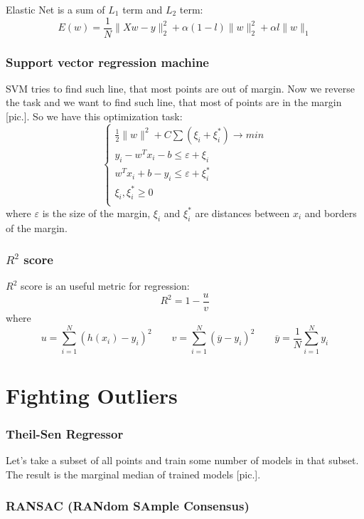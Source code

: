 Elastic Net is a sum of $L_1$ term and $L_2$ term:
$$E(w)=\frac{1}{N}\|Xw-y\|_2^2+\alpha(1-l)\|w\|_2^2+\alpha l\|w\|_1$$

\subsubsection*{Support vector regression machine}

SVM tries to find such line, that most points are out of margin. Now we reverse the task and we want to find such line, that most of points are in the margin [pic.]. So we have this optimization task:
$$\begin{cases}
	\frac{1}{2}\|w\|^2+C\sum(\xi_i+\xi_i^*)\to min \\
	y_i-w^Tx_i-b\le\varepsilon+\xi_i \\
	w^Tx_i+b-y_i\le\varepsilon+\xi_i^* \\
	\xi_i,\xi_i^* \ge 0 \\
\end{cases}$$
where $\varepsilon$ is the size of the margin, $\xi_i$ and $\xi_i^*$ are distances between $x_i$ and borders of the margin.

\subsubsection*{$R^2$ score}

$R^2$ score is an useful metric for regression:
$$R^2=1-\frac{u}{v}$$
where
$$u=\sum\limits_{i=1}^{N}(h(x_i)-y_i)^2\qquad v=\sum\limits_{i=1}^{N}(\overline{y}-y_i)^2\qquad \overline{y}=\frac{1}{N}\sum\limits_{i=1}^{N}y_i$$

\section{Fighting Outliers}
\vspace{-0.6cm}
\subsubsection*{Theil-Sen Regressor}

Let's take a subset of all points and train some number of models in that subset. The result is the marginal median of trained models [pic.].

\subsubsection*{RANSAC (RANdom SAmple Consensus)}

